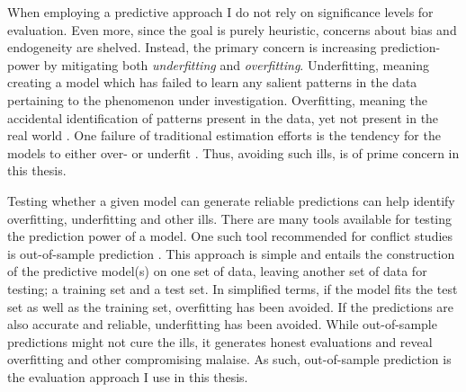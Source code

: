 \documentclass[a4paper]{article}
\begin{document}

When employing a predictive approach I do not rely on significance levels for evaluation. Even more, since the goal is purely heuristic, concerns about bias and endogeneity are shelved. Instead, the primary concern is increasing prediction-power by mitigating both \emph{underfitting} and \emph{overfitting}. Underfitting, meaning creating a model which has failed to learn any salient patterns in the data pertaining to the phenomenon under investigation. Overfitting, meaning the accidental identification of patterns present in the data, yet not present in the real world \citep[165-168]{Mcelreath_2018}. One failure of traditional estimation efforts is the tendency for the models to either over- or underfit \citep[364]{Ward_Greenhill_Bakke_2010}. Thus, avoiding such ills, is of prime concern in this thesis.\par 

Testing whether a given model can generate reliable predictions can help identify overfitting, underfitting and other ills. There are many tools available for testing the prediction power of a model. One such tool recommended for conflict studies is out-of-sample prediction \citep{king_zeng_2001b, Ward_Greenhill_Bakke_2010, perry_2013, Schrodt_2014}. This approach is simple and entails the construction of the predictive model(s) on one set of data, leaving another set of data for testing; a training set and a test set. In simplified terms, if the model fits the test set as well as the training set, overfitting has been avoided. If the predictions are also accurate and reliable, underfitting has been avoided. While out-of-sample predictions might not cure the ills, it generates honest evaluations and reveal overfitting and other compromising malaise. As such, out-of-sample prediction is the evaluation approach I use in this thesis.\par
\end{document}
